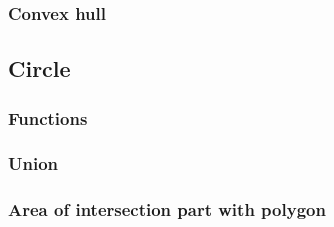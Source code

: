 \subsubsection{Convex hull}


\subsection{Circle}
\subsubsection{Functions}

\subsubsection{Union}

\subsubsection{Area of intersection part with polygon}


